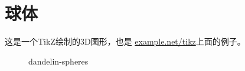 {\centering\section{球体}}
这是一个TikZ绘制的3D图形，也是
\href{https://texample.net/tikz/examples/dandelin-spheres/}{example.net/tikz}上面的例子。
\begin{figure}[h]
    \centering
   
   \caption{dandelin-spheres}
\end{figure}


\newpage